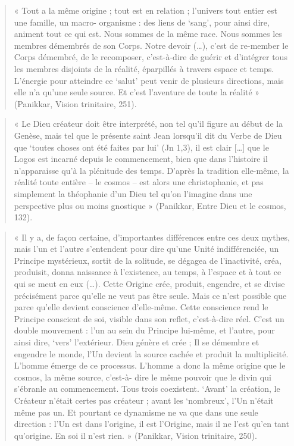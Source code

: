 \begin{quote}
    
« Tout a la même origine ; tout est en relation ; l’univers tout entier est une famille, un macro- 
organisme : des liens de ‘sang’, pour ainsi dire, animent tout ce qui est. Nous sommes de la même 
race. Nous sommes les membres démembrés de son Corps. Notre devoir (…), c’est de re-member le Corps 
démembré, de le recomposer, c’est-à-dire de guérir et d’intégrer tous les membres disjoints de la 
réalité, éparpillés à travers espace et temps. L’énergie pour atteindre ce ‘salut’ peut venir de 
plusieurs directions, mais elle n’a qu’une seule source. Et c’est l’aventure de toute la réalité » 
(Panikkar, Vision trinitaire, 251).

\end{quote}
\begin{quote}
    
« Le Dieu créateur doit être interprété, non tel qu’il figure au début de la Genèse, mais tel que 
le présente saint Jean lorsqu’il dit du Verbe de Dieu que ‘toutes choses ont été faites par lui’ 
(Jn 1,3), il est clair […] que le Logos est incarné depuis le commencement, bien que dans
l’histoire il n’apparaisse qu’à la plénitude des temps. D’après la tradition elle-même, la réalité 
toute entière – le cosmos – est alors une christophanie, et pas simplement la théophanie d’un Dieu 
tel qu’on l’imagine dans une perspective plus ou moins gnostique » (Panikkar, Entre Dieu et le 
cosmos, 132).

\end{quote}
\begin{quote}
    
« Il y a, de façon certaine, d’importantes différences entre ces deux mythes, mais l’un et l’autre 
s’entendent pour dire qu’une Unité indifférenciée, un Principe mystérieux, sortit de la solitude, 
se dégagea de l’inactivité, créa, produisit, donna naissance à l’existence, au temps, à l’espace et 
à tout ce qui se meut en eux (…). Cette Origine crée, produit, engendre, et se divise précisément 
parce qu’elle ne veut pas être seule. Mais ce n’est possible que parce qu’elle devient conscience 
d’elle-même. Cette conscience rend le Principe conscient de soi, visible dans son reflet, 
c’est-à-dire réel. C’est un double mouvement : l’un au sein du Principe lui-même, et l’autre, pour 
ainsi dire, ‘vers’ l’extérieur. Dieu génère et crée ; Il se démembre et engendre le monde, l’Un 
devient la source cachée et produit la multiplicité. L’homme émerge de ce processus. L’homme a donc 
la même origine que le cosmos, la même source, c’est-à- dire le même pouvoir que le divin qui 
s’ébranle au commencement. Tous trois coexistent. ‘Avant’ la création, le Créateur n’était certes 
pas créateur ; avant les ‘nombreux’, l’Un n’était même pas un. Et pourtant ce dynamisme ne va que 
dans une seule direction : l’Un est dans l’origine, il est l’Origine, mais il ne l’est qu’en tant 
qu’origine. En soi il n’est rien. » (Panikkar, Vision trinitaire, 250).

\end{quote}
